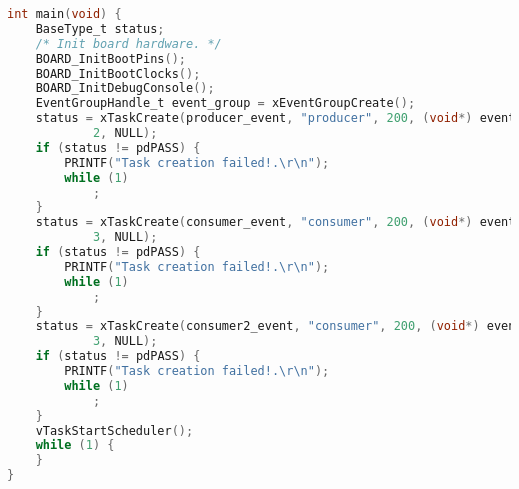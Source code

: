 \begin{lstlisting}[language=c,caption=Problem 4.3 main, label=list:p4_3_main]
int main(void) {
    BaseType_t status;
    /* Init board hardware. */
    BOARD_InitBootPins();
    BOARD_InitBootClocks();
    BOARD_InitDebugConsole();
    EventGroupHandle_t event_group = xEventGroupCreate();
    status = xTaskCreate(producer_event, "producer", 200, (void*) event_group,
            2, NULL);
    if (status != pdPASS) {
        PRINTF("Task creation failed!.\r\n");
        while (1)
            ;
    }
    status = xTaskCreate(consumer_event, "consumer", 200, (void*) event_group,
            3, NULL);
    if (status != pdPASS) {
        PRINTF("Task creation failed!.\r\n");
        while (1)
            ;
    }
    status = xTaskCreate(consumer2_event, "consumer", 200, (void*) event_group,
            3, NULL);
    if (status != pdPASS) {
        PRINTF("Task creation failed!.\r\n");
        while (1)
            ;
    }
    vTaskStartScheduler();
    while (1) {
    }
}
\end{lstlisting}

